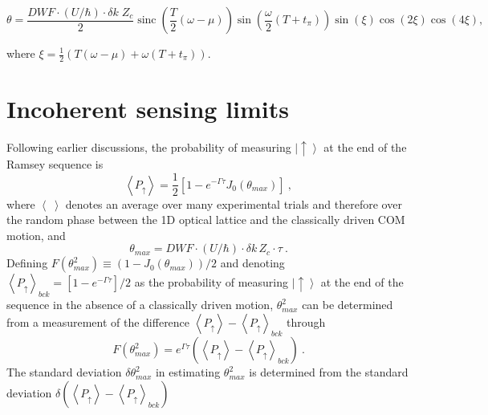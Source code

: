 \documentclass[aps,prl,superscriptaddress,floatfix]{revtex4-1}
\DeclareMathOperator{\sinc}{sinc}
\begin{document}
\begin{widetext}
\begin{equation}
\theta = \frac{DWF \cdot (U/\hbar) \cdot \delta k\;Z_c}{2}  \sinc\left( \frac{T}{2} \left( \omega-\mu \right) \right) \sin\left( \frac{\omega}{2} \left( T+t_{\pi} \right) \right) \sin(\xi)\cos(2 \xi)\cos(4 \xi),
\end{equation}
\end{widetext}

where $\xi = \frac{1}{2}\left( T(\omega - \mu) + \omega(T+t_{\pi}) \right)$. 

\part*{Incoherent sensing limits}

Following earlier discussions, the probability of measuring $\left|\uparrow\right\rangle $
at the end of the Ramsey sequence is 
\begin{equation}
\left\langle P_{\uparrow}\right\rangle =\frac{1}{2}\left[1-e^{-\Gamma\tau}J_{0}\left(\theta_{max}\right)\right]\:,\label{eq:P_up formula}
\end{equation}
where $\left\langle \:\right\rangle $ denotes an average over many
experimental trials and therefore over the random phase between the
1D optical lattice and the classically driven COM motion, and
\begin{equation}
\theta_{max}=DWF\cdot\left(U/\hbar\right)\cdot\delta k\,Z_{c}\cdot\tau\:.\label{eq:theta_max formula}
\end{equation}
Defining $F\left(\theta_{max}^{2}\right)\equiv\left(1-J_{0}\left(\theta_{max}\right)\right)/2$
and denoting $\left\langle P_{\uparrow}\right\rangle _{bck}=\left[1-e^{-\Gamma\tau}\right]/2$
as the probability of measuring $\left|\uparrow\right\rangle $ at
the end of the sequence in the absence of a classically driven motion,
$\theta_{max}^{2}$ can be determined from a measurement of the difference
$\left\langle P_{\uparrow}\right\rangle -\left\langle P_{\uparrow}\right\rangle _{bck}$
through
\begin{equation}
F\left(\theta_{max}^{2}\right)=e^{\Gamma\tau}\left(\left\langle P_{\uparrow}\right\rangle -\left\langle P_{\uparrow}\right\rangle _{bck}\right)\:.\label{eq:P_up difference}
\end{equation}
The standard deviation $\delta\theta_{max}^{2}$ in estimating $\theta_{max}^{2}$
is determined from the standard deviation $\delta\left(\left\langle P_{\uparrow}\right\rangle -\left\langle P_{\uparrow}\right\rangle _{bck}\right)$
\end{document}
